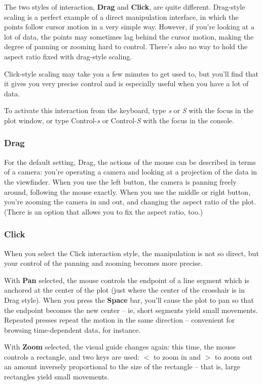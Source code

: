 \documentclass[11pt]{article}
\def\Widget#1{\textbf{#1}}
\begin{document}
The two styles of interaction, \Widget{Drag} and \Widget{Click}, are
quite different.  Drag-style scaling is a perfect example of a direct
manipulation interface, in which the points follow cursor motion in a
very simple way.  However, if you're looking at a lot of data, the
points may sometimes lag behind the cursor motion, making the degree
of panning or zooming hard to control.  There's also no way to hold
the aspect ratio fixed with drag-style scaling.

Click-style scaling may take you a few minutes to get used to, but
you'll find that it gives you very precise control and is especially
useful when you have a lot of data.

To activate this interaction from the keyboard, type {\em s} or
{\em S} with the focus in the plot window, or type Control-{\em s} or
Control-{\em S} with the focus in the console.

\subsubsection{Drag}

For the default setting, Drag, the actions of the mouse can be
described in terms of a camera:  you're operating a camera and
looking at a projection of the data in the viewfinder.  When you use
the left button, the camera is panning freely around, following the
mouse exactly.  When you use the middle or right button, you're
zooming the camera in and out, and changing the aspect ratio of
the plot.  (There is an option that allows you to fix the
aspect ratio, too.)

\subsubsection{Click}

When you select the Click interaction style, the manipulation is
not so direct, but your control of the panning and zooming becomes
more precise.

With \Widget{Pan} selected, the mouse controls the endpoint of a line
segment which is anchored at the center of the plot (just where the
center of the crosshair is in Drag style).  When you press the
\Widget{Space} bar, you'll cause the plot to pan so that the endpoint
becomes the new center -- ie, short segments yield small movements.
Repeated presses repeat the motion in the same direction -- convenient
for browsing time-dependent data, for instance.

With \Widget{Zoom} selected, the visual guide changes again: this time,
the mouse controls a rectangle, and two keys are used: {\boldmath $<$}
to zoom in and {\boldmath $>$} to zoom out an amount inversely
proportional to the size of the rectangle -- that is, large rectangles
yield small movements.
\end{document}
